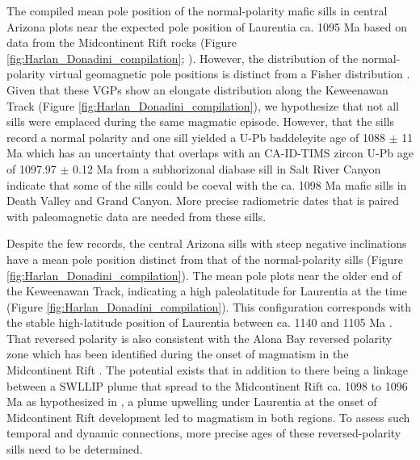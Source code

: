 The compiled mean pole position of the normal-polarity mafic sills in central Arizona plots near the expected pole position of Laurentia ca. 1095 Ma based on data from the Midcontinent Rift rocks (Figure \ref{fig:Harlan_Donadini_compilation}; \citealp{Swanson-Hysell2019a}). However, the distribution of the normal-polarity virtual geomagnetic pole positions is distinct from a Fisher distribution \citep{Fisher1953a}. Given that these VGPs show an elongate distribution along the Keweenawan Track (Figure \ref{fig:Harlan_Donadini_compilation}), we hypothesize that not all sills were emplaced during the same magmatic episode. However, that the sills record a normal polarity and one sill yielded a U-Pb baddeleyite age of 1088 $\pm$ 11 Ma \citep{Bright2014a} which has an uncertainty that overlaps with an CA-ID-TIMS zircon U-Pb age of 1097.97 $\pm$ 0.12 Ma from a subhorizonal diabase sill in Salt River Canyon \citep{Mohr2024a} indicate that some of the sills could be coeval with the ca. 1098 Ma mafic sills in Death Valley and Grand Canyon. More precise radiometric dates that is paired with paleomagnetic data are needed from these sills. 

Despite the few records, the central Arizona sills with steep negative inclinations have a mean pole position distinct from that of the normal-polarity sills (Figure \ref{fig:Harlan_Donadini_compilation}). The mean pole plots near the older end of the Keweenawan Track, indicating a high paleolatitude for Laurentia at the time (Figure \ref{fig:Harlan_Donadini_compilation}). This configuration corresponds with the stable high-latitude position of Laurentia between ca. 1140 and 1105 Ma \citep{Ernst1993a, Piispa2018a, Swanson-Hysell2021c}. That reversed polarity is also consistent with the Alona Bay reversed polarity zone which has been identified during the onset of magmatism in the Midcontinent Rift \citep{Swanson-Hysell2019a}. The potential exists that in addition to there being a linkage between a SWLLIP plume that spread to the Midcontinent Rift ca. 1098 to 1096 Ma as hypothesized in \cite{Mohr2024a}, a plume upwelling under Laurentia at the onset of Midcontinent Rift development led to magmatism in both regions. To assess such temporal and dynamic connections, more precise ages of these reversed-polarity sills need to be determined. 

